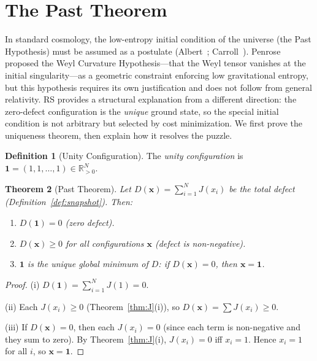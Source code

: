 \documentclass[12pt,a4paper]{article}
\newtheorem{theorem}{Theorem}[section]
\theoremstyle{definition}
\newtheorem{definition}[theorem]{Definition}
\theoremstyle{remark}
\begin{document}
\section{The Past Theorem}
\label{sec:past}

In standard cosmology, the low-entropy initial condition of the
universe (the Past Hypothesis) must be assumed as a postulate
(Albert~\cite{Albert2000}; Carroll~\cite{Carroll2010}).
Penrose~\cite{Penrose2004} proposed the Weyl Curvature Hypothesis---that
the Weyl tensor vanishes at the initial singularity---as a geometric
constraint enforcing low gravitational entropy, but this hypothesis
requires its own justification and does not follow from general
relativity.  RS provides a
structural explanation from a different direction: the zero-defect
configuration is the \emph{unique} ground state, so the special initial
condition is not arbitrary but selected by cost minimization.  We first
prove the uniqueness theorem, then explain how it resolves the puzzle.

\begin{definition}[Unity Configuration]
\label{def:unity}
The \emph{unity configuration} is
$\mathbf{1} = (1, 1, \ldots, 1) \in \mathbb{R}_{>0}^N$.
\end{definition}

\begin{theorem}[Past Theorem]
\label{thm:past}
Let $D(\mathbf{x}) = \sum_{i=1}^{N} J(x_i)$ be the total defect
(Definition~\ref{def:snapshot}).  Then:
\begin{enumerate}[label=(\roman*),nosep]
  \item $D(\mathbf{1}) = 0$ (zero defect).
  \item $D(\mathbf{x}) \geq 0$ for all configurations $\mathbf{x}$
  (defect is non-negative).
  \item $\mathbf{1}$ is the unique global minimum of $D$: if
  $D(\mathbf{x}) = 0$, then $\mathbf{x} = \mathbf{1}$.
\end{enumerate}
\end{theorem}

\begin{proof}
(i) $D(\mathbf{1}) = \sum_{i=1}^{N} J(1) = 0$.

(ii) Each $J(x_i) \geq 0$ (Theorem~\ref{thm:J}(i)), so
$D(\mathbf{x}) = \sum J(x_i) \geq 0$.

(iii) If $D(\mathbf{x}) = 0$, then each $J(x_i) = 0$ (since each term
is non-negative and they sum to zero).  By Theorem~\ref{thm:J}(i),
$J(x_i) = 0$ iff $x_i = 1$.  Hence $x_i = 1$ for all $i$, so
$\mathbf{x} = \mathbf{1}$.
\end{proof}
\end{document}
